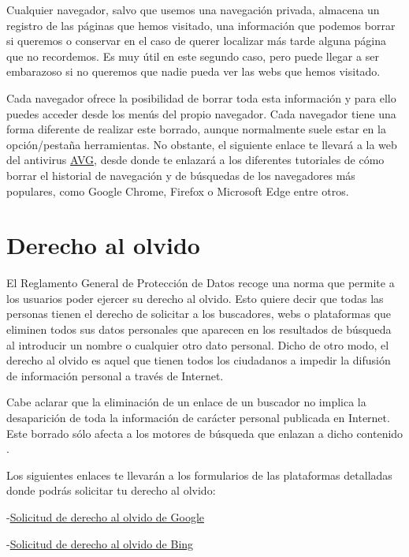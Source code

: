 \documentclass[
  a4paper,
  openany]{book}
\begin{document}
Cualquier navegador, salvo que usemos una navegación privada, almacena un registro de las páginas que hemos visitado, una información que podemos borrar si queremos o conservar en el caso de querer localizar más tarde alguna página que no recordemos. Es muy útil en este segundo caso, pero puede llegar a ser embarazoso si no queremos que nadie pueda ver las webs que hemos visitado.

Cada navegador ofrece la posibilidad de borrar toda esta información y para ello puedes acceder desde los menús del propio navegador. Cada navegador tiene una forma diferente de realizar este borrado, aunque normalmente suele estar en la opción/pestaña herramientas. No obstante, el siguiente enlace te llevará a la web del antivirus \href{https://www.avg.com/es/signal/how-to-clear-your-browsing-and-search-history}{AVG}, desde donde te enlazará a los diferentes tutoriales de cómo borrar el historial de navegación y de búsquedas de los navegadores más populares, como Google Chrome, Firefox o Microsoft Edge entre otros.

\hypertarget{derecho-al-olvido}{%
\section{Derecho al olvido}\label{derecho-al-olvido}}

El Reglamento General de Protección de Datos recoge una norma que permite a los usuarios poder ejercer su derecho al olvido. Esto quiere decir que todas las personas tienen el derecho de solicitar a los buscadores, webs o plataformas que eliminen todos sus datos personales que aparecen en los resultados de búsqueda al introducir un nombre o cualquier otro dato personal. Dicho de otro modo, el derecho al olvido es aquel que tienen todos los ciudadanos a impedir la difusión de información personal a través de Internet.

Cabe aclarar que la eliminación de un enlace de un buscador no implica la desaparición de toda la información de carácter personal publicada en Internet. Este borrado sólo afecta a los motores de búsqueda que enlazan a dicho contenido \citep{OSI-derecho-al-olvido}.

Los siguientes enlaces te llevarán a los formularios de las plataformas detalladas donde podrás solicitar tu derecho al olvido:

-\href{https://support.google.com/websearch/troubleshooter/3111061?hl=es}{Solicitud de derecho al olvido de Google}

-\href{https://help.bing.microsoft.com/\#apex/18/ES/10013/-1/ES}{Solicitud de derecho al olvido de Bing}
\end{document}
